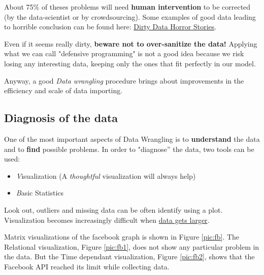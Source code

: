 About 75\% of theses problems will need \textbf{human intervention} to be corrected (by the data-scientist or by crowdsourcing). Some examples of good data leading to horrible conclusion can be found here: \href{https://www.linkedin.com/pulse/dirty-data-horror-stories-when-michael}{Dirty Data Horror Stories}.

Even if it seems really dirty, \textbf{beware not to over-sanitize the data!} Applying what we can call "defensive programming" is not a good idea because we risk losing any interesting data, keeping only the ones that fit perfectly in our model.

Anyway, a good \emph{Data wrangling} procedure brings about improvements in the efficiency and scale of data importing.

\subsection{Diagnosis of the data}

One of the most important aspects of Data Wrangling is to {\bf understand} the data and to {\bf find} possible problems. In order to "diagnose'' the data, two tools can be used:
\begin{itemize}
 \item {\emph Visualization} (A {\it thoughtful} visualization will always help)
 \item {\emph Basic Statistics} 
\end{itemize}

Look out, outliers and missing data can be often identify using a plot. Visualization becomes increasingly difficult when  \href{http://fellinlovewithdata.com/guides/how-do-you-visualize-too-much-data}{data gets larger}.

Matrix visualizations of the facebook graph is shown in Figure \ref{pic:fb}. The Relational visualization, Figure \ref{pic:fb1}, does not show any particular problem in the data. But the Time dependant visualization, Figure \ref{pic:fb2}, shows that the Facebook API reached its limit while collecting data.

